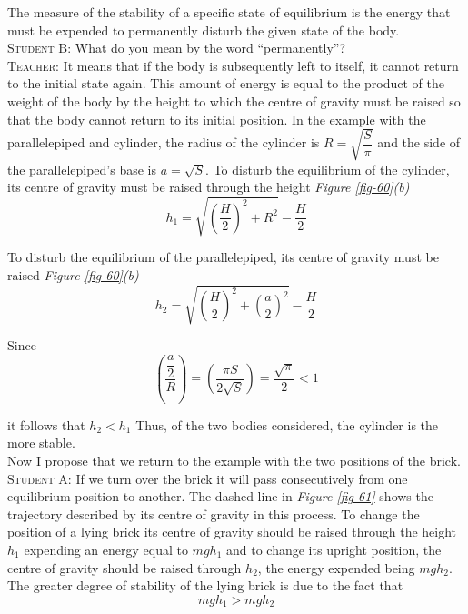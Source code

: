 \documentclass[a4paper,sfsidenotes]{tufte-book}
\begin{document}
The measure of the stability of a specific state of equilibrium is the energy that must be expended to permanently disturb the given state of the body.
\\
\textsc{Student B:} What do you mean by the word ``permanently''?
\\
\textsc{Teacher:} It means that if the body is subsequently left to itself, it cannot return to the initial state again. This amount of energy is equal to the product of the weight of the body by the height to which the centre of gravity must be raised so that the body cannot return to its initial position. In the
example with the parallelepiped and cylinder, the radius of the cylinder is $R=\sqrt{\dfrac{S}{\pi}}$ and the side of the parallelepiped's base is $a=\sqrt{S}$. To disturb the equilibrium of the cylinder, its centre of gravity must be raised through the height \emph{Figure \ref{fig-60}(b)}\\
\begin{equation*}
h_{1} = \sqrt{ \left( \frac{H}{2}\right)^{2} + R^{2}} - \frac{H}{2}
\end{equation*}

To disturb the equilibrium of the parallelepiped, its centre of gravity must be raised  \emph{Figure \ref{fig-60}(b)}\\
\begin{equation*}
h_{2} = \sqrt{ \left( \frac{H}{2}\right)^{2} +  \left(\frac{a}{2}\right)^{2}} - \frac{H}{2}
\end{equation*}

Since\\
\begin{equation*}
 \left( \frac{\dfrac{a}{2}}{R} \right)  = \left(\frac{\pi S}{2\sqrt{S}}\right) = \frac{\sqrt{\pi}}{2} < 1
\end{equation*}

it follows that $h_{2} < h_{1}$ Thus, of the two bodies considered, the cylinder is the more stable.
\\
Now I propose that we return to the example with the two positions of the brick.
\\
\textsc{Student A:} If we turn over the brick it will pass consecutively from one equilibrium position to another. The dashed line in \emph{Figure \ref{fig-61}} shows the trajectory described by its centre of gravity in this process. To change the position of a lying brick its centre of gravity should be raised through the height $h_{1}$ expending an energy equal to $mgh_{1}$ and to change its upright
position, the centre of gravity should be raised through $h_{2}$, the energy expended being $mgh_{2}$.  The greater degree of stability of the lying brick is due to the fact that 
\begin{equation}
mgh_{1} > mgh_{2}
\label{eq-82}
\end{equation}
\end{document}
